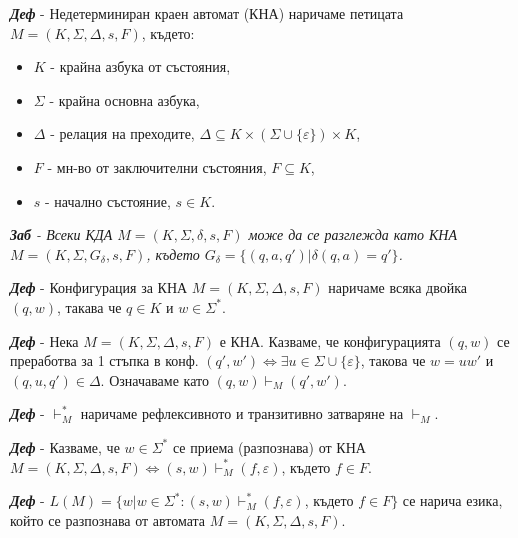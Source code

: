 \documentclass[fleqn,12pt]{article}
\begin{document}
\begin{flushleft}
\textit{\textbf{Деф}} - Недетерминиран краен автомат (КНА) наричаме петицата $M = (K, \Sigma, \Delta, s, F)$, където:
\begin{itemize}
    \item $K$ - крайна азбука от състояния,
    \item $\Sigma$ - крайна основна азбука,
    \item $\Delta$ - релация на преходите, $\Delta \subseteq K \times (\Sigma \cup \{ \varepsilon \} ) \times K$,
    \item $F$ - мн-во от заключителни състояния, $F \subseteq K$,
    \item $s$ - начално състояние, $s \in K$.
\end{itemize}

\textit{\textbf{Заб} - Всеки КДА $M = (K, \Sigma, \delta, s, F)$ може да се разглежда като КНА $M = (K, \Sigma, G_\delta, s, F)$, където $G_\delta = \{(q, a, q') | \delta(q, a) = q' \}$.}

\textit{\textbf{Деф}} - Конфигурация за КНА $M = (K, \Sigma, \Delta, s, F)$ наричаме всяка двойка $(q, w)$, такава че $q \in K$ и $w \in \Sigma^*$.

\textit{\textbf{Деф}} - Нека $M = (K, \Sigma, \Delta, s, F)$ е КНА. Казваме, че конфигурацията $(q, w)$ се преработва за 1 стъпка в конф. $(q', w') \iff \exists u \in \Sigma \cup \{\varepsilon\}$, такова че $w = uw'$ и $(q, u, q') \in \Delta$. Означаваме като $(q, w) \vdash_M (q', w')$.

\textit{\textbf{Деф}} - $\vdash_M^*$ наричаме рефлексивното и транзитивно затваряне на $\vdash_M$.

\textit{\textbf{Деф}} - Казваме, че $w \in \Sigma^*$ се приема (разпознава) от КНА $M = (K, \Sigma, \Delta, s, F) \iff (s, w) \vdash_M^* (f, \varepsilon)$, където $f \in F$. 

\textit{\textbf{Деф}} - $L(M) = \{w | w \in \Sigma^*: (s, w) \vdash_M^* (f, \varepsilon)$, където $f \in F\}$ се нарича езика, който се разпознава от автомата $M = (K, \Sigma, \Delta, s, F)$.


\end{flushleft}
\end{document}

